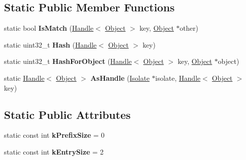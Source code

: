 \subsection*{Static Public Member Functions}
\begin{DoxyCompactItemize}
\item 
static bool {\bfseries Is\+Match} (\hyperlink{classv8_1_1internal_1_1_handle}{Handle}$<$ \hyperlink{classv8_1_1internal_1_1_object}{Object} $>$ key, \hyperlink{classv8_1_1internal_1_1_object}{Object} $\ast$other)\hypertarget{classv8_1_1internal_1_1_object_hash_table_shape_ac94f485cf9e0b2b96b9eb815bcabae44}{}\label{classv8_1_1internal_1_1_object_hash_table_shape_ac94f485cf9e0b2b96b9eb815bcabae44}

\item 
static uint32\+\_\+t {\bfseries Hash} (\hyperlink{classv8_1_1internal_1_1_handle}{Handle}$<$ \hyperlink{classv8_1_1internal_1_1_object}{Object} $>$ key)\hypertarget{classv8_1_1internal_1_1_object_hash_table_shape_a026409866e62f58f5470550515a41d28}{}\label{classv8_1_1internal_1_1_object_hash_table_shape_a026409866e62f58f5470550515a41d28}

\item 
static uint32\+\_\+t {\bfseries Hash\+For\+Object} (\hyperlink{classv8_1_1internal_1_1_handle}{Handle}$<$ \hyperlink{classv8_1_1internal_1_1_object}{Object} $>$ key, \hyperlink{classv8_1_1internal_1_1_object}{Object} $\ast$object)\hypertarget{classv8_1_1internal_1_1_object_hash_table_shape_a55d31c48863fe7ac61ef113a7bd4ad6d}{}\label{classv8_1_1internal_1_1_object_hash_table_shape_a55d31c48863fe7ac61ef113a7bd4ad6d}

\item 
static \hyperlink{classv8_1_1internal_1_1_handle}{Handle}$<$ \hyperlink{classv8_1_1internal_1_1_object}{Object} $>$ {\bfseries As\+Handle} (\hyperlink{classv8_1_1internal_1_1_isolate}{Isolate} $\ast$isolate, \hyperlink{classv8_1_1internal_1_1_handle}{Handle}$<$ \hyperlink{classv8_1_1internal_1_1_object}{Object} $>$ key)\hypertarget{classv8_1_1internal_1_1_object_hash_table_shape_a8a31033c7676afe1bb362bd48e38ab49}{}\label{classv8_1_1internal_1_1_object_hash_table_shape_a8a31033c7676afe1bb362bd48e38ab49}

\end{DoxyCompactItemize}
\subsection*{Static Public Attributes}
\begin{DoxyCompactItemize}
\item 
static const int {\bfseries k\+Prefix\+Size} = 0\hypertarget{classv8_1_1internal_1_1_object_hash_table_shape_aa9507cf40bf2390bcffdf347c8fc26a2}{}\label{classv8_1_1internal_1_1_object_hash_table_shape_aa9507cf40bf2390bcffdf347c8fc26a2}

\item 
static const int {\bfseries k\+Entry\+Size} = 2\hypertarget{classv8_1_1internal_1_1_object_hash_table_shape_ae2fbbf6aa03504427fe4bb77279d3f4f}{}\label{classv8_1_1internal_1_1_object_hash_table_shape_ae2fbbf6aa03504427fe4bb77279d3f4f}

\end{DoxyCompactItemize}


